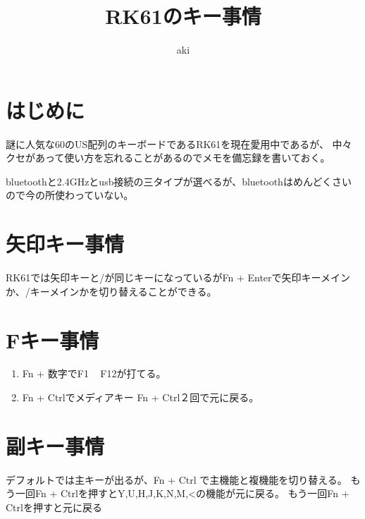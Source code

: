 \documentclass[dvipdfmx]{jsarticle}
\begin{document}
\title{RK61のキー事情}
\author{aki}
\thispagestyle{empty}
\maketitle

\section{はじめに}

謎に人気な60のUS配列のキーボードであるRK61を現在愛用中であるが、
中々クセがあって使い方を忘れることがあるのでメモを備忘録を書いておく。


bluetoothと2.4GHzとusb接続の三タイプが選べるが、bluetoothはめんどくさいので今の所使わっていない。

\section{矢印キー事情}

RK61では矢印キーと/が同じキーになっているがFn + Enterで矢印キーメインか、/キーメインかを切り替えることができる。

\section{Fキー事情}

\begin{enumerate}
    \item Fn + 数字でF1 ~ F12が打てる。
    \item Fn + Ctrlでメディアキー Fn + Ctrl２回で元に戻る。
\end{enumerate}

\section{副キー事情}

デフォルトでは主キーが出るが、Fn + Ctrl で主機能と複機能を切り替える。  
もう一回Fn + Ctrlを押すとY,U,H,J,K,N,M,<の機能が元に戻る。
もう一回Fn + Ctrlを押すと元に戻る
\end{document}
